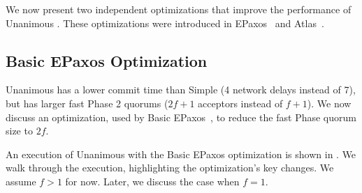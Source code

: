 We now present two independent optimizations that improve the performance of
Unanimous \BPaxos{}. These optimizations were introduced in
EPaxos~\cite{moraru2013there} and Atlas~\cite{enes2020state}.

\subsection{Basic EPaxos Optimization}
Unanimous \BPaxos{} has a lower commit time than Simple \BPaxos{} (4 network
delays instead of 7), but has larger fast Phase 2 quorums ($2f+1$ acceptors
instead of $f+1$). We now discuss an optimization, used by Basic
EPaxos~\cite{moraru2013there}, to reduce the fast Phase quorum size to $2f$.

{}

An execution of Unanimous \BPaxos{} with the Basic EPaxos optimization is shown
in . We walk through the execution, highlighting the
optimization's key changes. We assume $f > 1$ for now. Later, we discuss the
case when $f = 1$.
